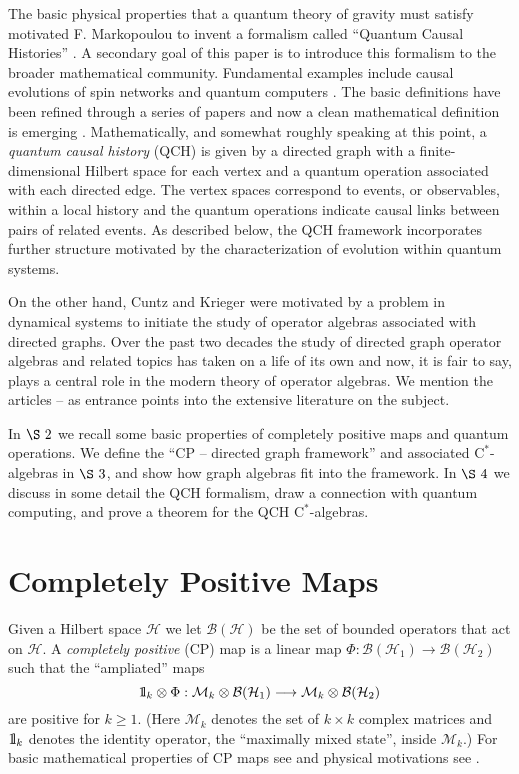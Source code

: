 \documentclass[12pt]{amsart}
\theoremstyle{plain}
\theoremstyle{definition}
\newcommand{\ca}{\mathrm{C}^*}
\newcommand{\B}{{\mathcal{B}}}
\renewcommand{\H}{{\mathcal{H}}}
\newcommand{\M}{{\mathcal{M}}}
\def\one{{\mathchoice{\rm 1\mskip-4mu l}{\rm 1\mskip-4mu l}{\rm 1\mskip-4.5mu l}{\rm
1\mskip-5mu l}}}
\begin{document}
The basic physical properties that a quantum theory of gravity
must satisfy motivated F. Markopoulou to invent a formalism called
``Quantum Causal Histories'' \cite{HMS,M02,M00C,M00B,M00A}. A
secondary goal of this paper is to introduce this formalism to the
broader mathematical community. Fundamental examples include
causal evolutions of spin networks \cite{Gupta,MS97} and quantum
computers \cite{M00C}. The basic definitions have been refined
through a series of papers and now a clean mathematical definition
is emerging \cite{HMS}. Mathematically, and somewhat roughly
speaking at this point, a {\it quantum causal history} (QCH) is
given by a directed graph with a finite-dimensional Hilbert space
for each vertex and a quantum operation associated with each
directed edge. The vertex spaces correspond to events, or
observables, within a local history and the quantum operations
indicate causal links between pairs of related events. As
described below, the QCH framework incorporates further structure
motivated by the characterization of evolution within quantum
systems.

On the other hand, Cuntz and Krieger \cite{CK} were motivated by a
problem in dynamical systems to initiate the study of operator
algebras associated with directed graphs. Over the past two
decades the study of directed graph operator algebras and related
topics has taken on a life of its own and now, it is fair to say,
plays a central role in the modern theory of operator algebras. We
mention the articles \cite{BP} -- \cite{Spi} as entrance points
into the extensive literature on the subject.

In $\S~2$ we recall some basic properties of completely positive
maps and quantum operations. We define the ``CP -- directed graph
framework'' and associated $\ca$-algebras in $\S~3$, and show how
graph algebras fit into the framework. In $\S~4$ we discuss in
some detail the QCH formalism, draw a connection with quantum
computing, and prove a theorem for the QCH $\ca$-algebras.




\section{Completely Positive Maps}   \label{S:cpmaps}

Given a Hilbert space $\H$ we let $\B(\H)$ be the set of bounded
operators that act on $\H$. A {\it completely positive} (CP) map
is a linear map $\Phi : \B(\H_1)\rightarrow\B(\H_2)$ such that the
``ampliated'' maps
\[
 \one_k \otimes \Phi : \M_k \otimes \B(\H_1) \longrightarrow
\M_k \otimes \B(\H_2)
\]
are positive for $k\geq 1$. (Here $\M_k$ denotes the set of
$k\times k$ complex matrices and $\one_k$ denotes the identity
operator, the ``maximally mixed state'', inside $\M_k$.) For basic
mathematical properties of CP maps see \cite{Paulsentext2} and
physical motivations see \cite{Kraustext}.
\end{document}
